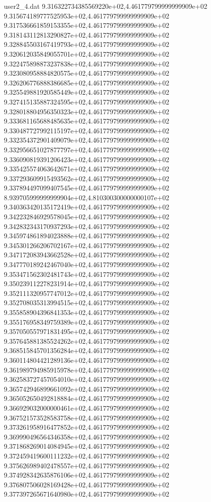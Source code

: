 \begin{filecontents}{user2_4.dat}
9.316322734385569220e+02,4.461779799999999909e+02
9.315674189777525953e+02,4.461779799999999909e+02
9.317536661859153355e+02,4.461779799999999909e+02
9.318143112813290827e+02,4.461779799999999909e+02
9.328845503167419793e+02,4.461779799999999909e+02
9.320612035849055701e+02,4.461779799999999909e+02
9.322475898873237838e+02,4.461779799999999909e+02
9.323080958884820575e+02,4.461779799999999909e+02
9.326206776888386685e+02,4.461779799999999909e+02
9.325549881920585449e+02,4.461779799999999909e+02
9.327415135887324595e+02,4.461779799999999909e+02
9.328018804956350323e+02,4.461779799999999909e+02
9.333681165688485635e+02,4.461779799999999909e+02
9.330487727992115197e+02,4.461779799999999909e+02
9.332354372901409079e+02,4.461779799999999909e+02
9.332956651027877797e+02,4.461779799999999909e+02
9.336090819391206423e+02,4.461779799999999909e+02
9.335425574063642671e+02,4.461779799999999909e+02
9.337293609915493562e+02,4.461779799999999909e+02
9.337894497099407545e+02,4.461779799999999909e+02
8.939705999999999904e+02,4.810300300000000107e+02
9.340363420135172419e+02,4.461779799999999909e+02
9.342232846929578045e+02,4.461779799999999909e+02
9.342832343170937293e+02,4.461779799999999909e+02
9.345974861894023888e+02,4.461779799999999909e+02
9.345301266206702167e+02,4.461779799999999909e+02
9.347172083943662528e+02,4.461779799999999909e+02
9.347770189242467040e+02,4.461779799999999909e+02
9.353471562302481743e+02,4.461779799999999909e+02
9.350239112278231914e+02,4.461779799999999909e+02
9.352111320957747012e+02,4.461779799999999909e+02
9.352708035313994515e+02,4.461779799999999909e+02
9.355858904396841353e+02,4.461779799999999909e+02
9.355176958349759389e+02,4.461779799999999909e+02
9.357050557971831495e+02,4.461779799999999909e+02
9.357645881385524262e+02,4.461779799999999909e+02
9.368515845701356284e+02,4.461779799999999909e+02
9.360114804421289136e+02,4.461779799999999909e+02
9.361989794985915978e+02,4.461779799999999909e+02
9.362583727457054010e+02,4.461779799999999909e+02
9.365742946899661092e+02,4.461779799999999909e+02
9.365052650492818884e+02,4.461779799999999909e+02
9.366929032000000461e+02,4.461779799999999909e+02
9.367521573528583758e+02,4.461779799999999909e+02
9.373261958916477852e+02,4.461779799999999909e+02
9.369990496564346358e+02,4.461779799999999909e+02
9.371868269014084945e+02,4.461779799999999909e+02
9.372459419600111232e+02,4.461779799999999909e+02
9.375626989402478557e+02,4.461779799999999909e+02
9.374928342635876106e+02,4.461779799999999909e+02
9.376807506028169428e+02,4.461779799999999909e+02
9.377397265671640980e+02,4.461779799999999909e+02

\end{filecontents}
